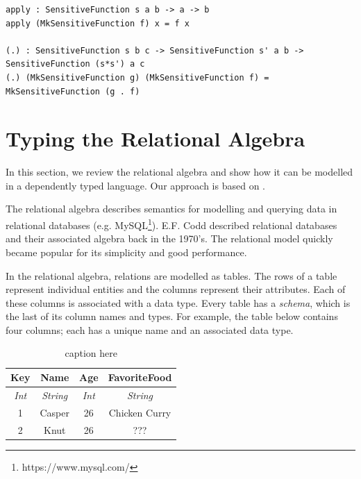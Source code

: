 \documentclass[12pt]{article}
\begin{document}
\begin{lstlisting}
apply : SensitiveFunction s a b -> a -> b
apply (MkSensitiveFunction f) x = f x

(.) : SensitiveFunction s b c -> SensitiveFunction s' a b -> SensitiveFunction (s*s') a c
(.) (MkSensitiveFunction g) (MkSensitiveFunction f) = MkSensitiveFunction (g . f)
\end{lstlisting}

\section{Typing the Relational Algebra}\label{sec:typing_the_relational_algebra}

In this section, we review the relational algebra and show how it can be modelled in a dependently typed language.
Our approach is based on \cite{OurySwierstra08PowerOfPi}.

The relational algebra describes semantics for modelling and querying data in relational databases (e.g. MySQL\footnote{https://www.mysql.com/}).
E.F. Codd described relational databases and their associated algebra back in the 1970's.
The relational model quickly became popular for its simplicity and good performance.

In the relational algebra, relations are modelled as tables.
The rows of a table represent individual entities and the columns represent their attributes.
Each of these columns is associated with a data type.
Every table has a \textit{schema}, which is the last of its column names and types.
For example, the table below contains four columns; each has a unique name and an associated data type.

\begin{table}[tb]
    \caption{caption here}
    \label{tab:tablename}
    \centering

    \begin{tabular}{|c|c|c|c|}
    \hline

    \hline
    \textbf{Key} & \textbf{Name} & \textbf{Age} & \textbf{FavoriteFood} \\
    \hline
    \textit{Int} & \textit{String} & \textit{Int} & \textit{String} \\
    \hline
    \hline
       1 & Casper & 26 & Chicken Curry \\
       2 & Knut & 26 & ??? \\
    \hline

    \end{tabular}
\end{table}
\end{document}
